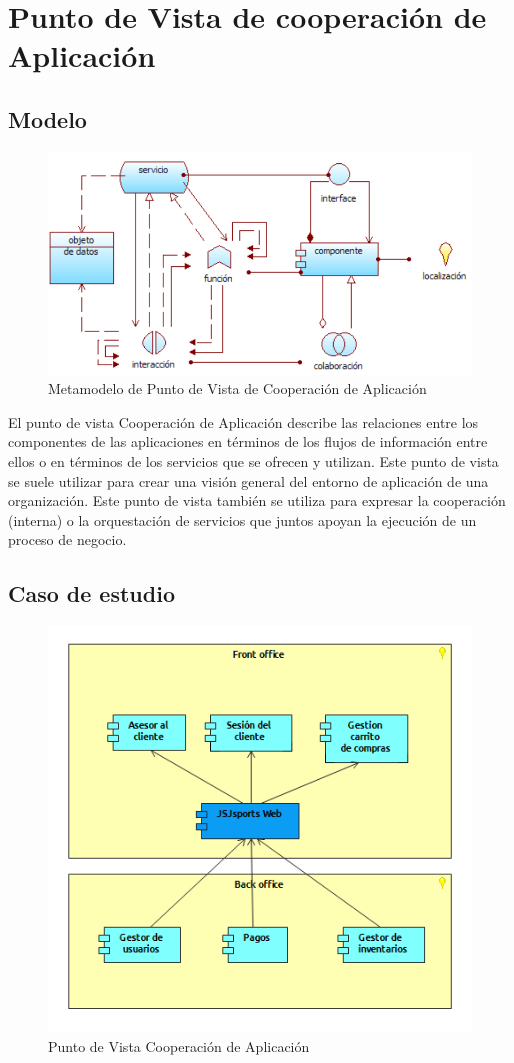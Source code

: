\section{Punto de Vista de cooperación de Aplicación}

\subsection{Modelo}

\begin{figure}[th!]
	\centering
	\includegraphics[width=0.5\linewidth]{arquitectura/imagenes/modeloCooperacionAplicacion}
	\caption{Metamodelo de Punto de Vista de Cooperación de Aplicación \cite{pun8}}
	\label{fig:metamodelo de punto de vista de cooperación de aplicación}
\end{figure}

El punto de vista Cooperación de Aplicación describe las relaciones entre los componentes de las aplicaciones en términos de los flujos de información entre ellos o en términos de los servicios que se ofrecen y utilizan. Este punto de vista se suele utilizar para crear una visión general del entorno de aplicación de una organización. Este punto de vista también se utiliza para expresar la cooperación (interna) o la orquestación de servicios que juntos apoyan la ejecución de un proceso de negocio.

\subsection{Caso de estudio}
\begin{figure}[th!]
	\centering
	\includegraphics[width=0.5\linewidth]{arquitectura/imagenes/VistaCooperacionAplicacion}
	\caption{Punto de Vista Cooperación de Aplicación}
	\label{fig:vistacooperacionaplicacion}
\end{figure}


